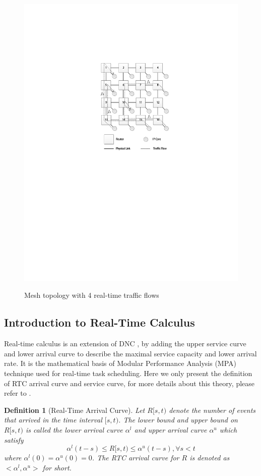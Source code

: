 \documentclass[10pt,journal]{IEEEtran}
\newtheorem{definition}{Definition}
\begin{document}
\begin{figure}
  \centering
  \includegraphics[scale=0.9]{figures/mesh.pdf}\\
  \caption{Mesh topology with 4 real-time traffic flows}\label{topology}
\end{figure}

\subsection{Introduction to Real-Time Calculus}
Real-time calculus is an extension of DNC \cite{1253607}, by adding the upper service curve and lower arrival curve to describe the maximal service capacity and lower arrival rate. It is the mathematical basis of Modular Performance Analysis (MPA) \cite{Wandeler2006System} technique used for real-time task scheduling. Here we only present the definition of RTC arrival curve and service curve, for more details about this theory, please refer to \cite{1253607}.
\begin{definition}[Real-Time Arrival Curve]
Let $R[s,t)$ denote the number of events that arrived in the time interval $[s,t)$. The lower bound and upper bound on $R[s,t)$ is called the lower arrival curve $\alpha^l$ and upper arrival curve $\alpha^u$ which satisfy
$$\alpha^l(t-s)\leq R[s,t)\leq \alpha^u(t-s),\forall s<t$$
where $\alpha^l(0)=\alpha^u(0)=0$. The RTC arrival curve for $R$ is denoted as $<\alpha^l,\alpha^u>$ for short.
\end{definition}
\end{document}

